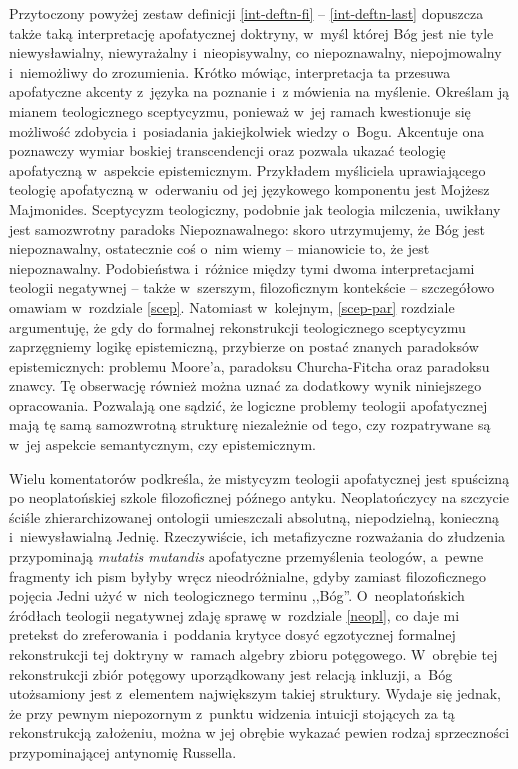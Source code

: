 Przytoczony powyżej zestaw definicji \ref{int-deftn-fi} -- \ref{int-deftn-last} dopuszcza także taką interpretację apofatycznej doktryny, w~myśl której Bóg jest nie tyle niewysławialny, niewyrażalny i~nieopisywalny, co niepoznawalny, niepojmowalny i~niemożliwy do zrozumienia. Krótko mówiąc, interpretacja ta przesuwa apofatyczne akcenty z~języka na poznanie i~z mówienia na myślenie. Określam ją mianem teologicznego sceptycyzmu, ponieważ w~jej ramach kwestionuje się możliwość zdobycia i~posiadania jakiejkolwiek wiedzy o~Bogu. Akcentuje ona poznawczy wymiar boskiej transcendencji oraz pozwala ukazać teologię apofatyczną w~aspekcie epistemicznym. Przykładem myśliciela uprawiającego teologię apofatyczną w~oderwaniu od jej językowego komponentu jest Mojżesz Majmonides. Sceptycyzm teologiczny, podobnie jak teologia milczenia, uwikłany jest samozwrotny paradoks Niepoznawalnego: skoro utrzymujemy, że Bóg jest niepoznawalny, ostatecznie coś o~nim wiemy -- mianowicie to, że jest niepoznawalny. Podobieństwa i~różnice między tymi dwoma interpretacjami teologii negatywnej -- także w~szerszym, filozoficznym kontekście -- szczegółowo omawiam w~rozdziale \ref{scep}. Natomiast w~kolejnym, \ref{scep-par} rozdziale argumentuję, że gdy do formalnej rekonstrukcji teologicznego sceptycyzmu zaprzęgniemy logikę epistemiczną, przybierze on postać znanych paradoksów epistemicznych: problemu Moore'a, paradoksu Churcha-Fitcha oraz paradoksu znawcy. Tę obserwację również można uznać za dodatkowy wynik niniejszego opracowania. Pozwalają one sądzić, że logiczne problemy teologii apofatycznej mają tę samą samozwrotną strukturę niezależnie od tego, czy rozpatrywane są w~jej aspekcie semantycznym, czy epistemicznym.

Wielu komentatorów podkreśla, że mistycyzm teologii apofatycznej jest spuścizną po neoplatońskiej szkole filozoficznej późnego antyku. Neoplatończycy na szczycie ściśle zhierarchizowanej ontologii umieszczali absolutną, niepodzielną, konieczną i~niewysławialną Jednię. Rzeczywiście, ich metafizyczne rozważania do złudzenia przypominają \textit{mutatis mutandis} apofatyczne przemyślenia teologów, a~pewne fragmenty ich pism byłyby wręcz nieodróżnialne, gdyby zamiast filozoficznego pojęcia Jedni użyć w~nich teologicznego terminu ,,Bóg''. O~neoplatońskich źródłach teologii negatywnej zdaję sprawę w~rozdziale \ref{neopl}, co daje mi pretekst do zreferowania i~poddania krytyce dosyć egzotycznej formalnej rekonstrukcji tej doktryny w~ramach algebry zbioru potęgowego. W~obrębie tej rekonstrukcji zbiór potęgowy uporządkowany jest relacją inkluzji, a~Bóg utożsamiony jest z~elementem największym takiej struktury. Wydaje się jednak, że przy pewnym niepozornym z~punktu widzenia intuicji stojących za tą rekonstrukcją założeniu, można w jej obrębie wykazać pewien rodzaj sprzeczności przypominającej antynomię Russella.

